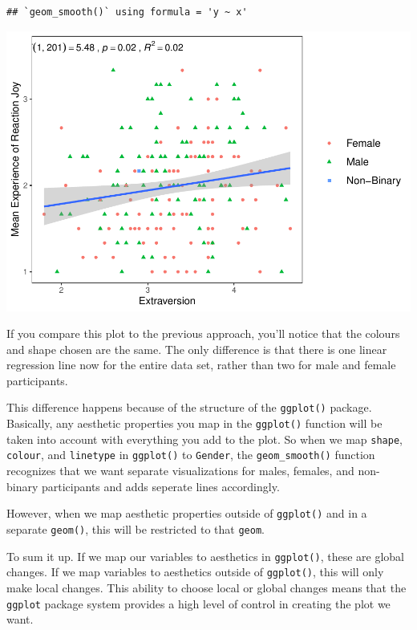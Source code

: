 \documentclass[
]{book}
\begin{document}
\begin{verbatim}
## `geom_smooth()` using formula = 'y ~ x'
\end{verbatim}

\includegraphics{rintro_demo_files/figure-latex/unnamed-chunk-317-1.pdf}

If you compare this plot to the previous approach, you'll notice that the colours and shape chosen are the same. The only difference is that there is one linear regression line now for the entire data set, rather than two for male and female participants.

This difference happens because of the structure of the \texttt{ggplot()} package. Basically, any aesthetic properties you map in the \texttt{ggplot()} function will be taken into account with everything you add to the plot. So when we map \texttt{shape}, \texttt{colour}, and \texttt{linetype} in \texttt{ggplot()} to \texttt{Gender}, the \texttt{geom\_smooth()} function recognizes that we want separate visualizations for males, females, and non-binary participants and adds seperate lines accordingly.

However, when we map aesthetic properties outside of \texttt{ggplot()} and in a separate \texttt{geom()}, this will be restricted to that \texttt{geom}.

To sum it up. If we map our variables to aesthetics in \texttt{ggplot()}, these are global changes. If we map variables to aesthetics outside of \texttt{ggplot()}, this will only make local changes. This ability to choose local or global changes means that the \texttt{ggplot} package system provides a high level of control in creating the plot we want.
\end{document}
